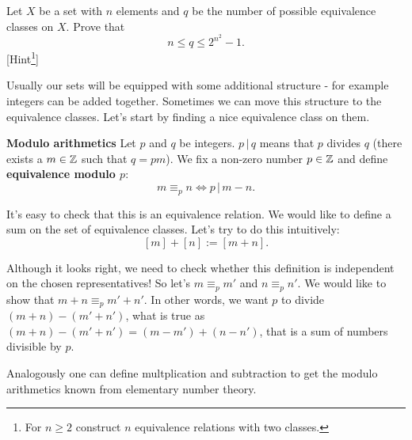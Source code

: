 \begin{exercise}
  Let $X$ be a set with $n$ elements and $q$ be the number of possible equivalence classes on $X$. Prove that $$n\le q \le 2^{n^2}-1.$$ [Hint\footnote{For $n\ge 2$ construct $n$ equivalence relations with two classes.}]
\end{exercise}

Usually our sets will be equipped with some additional structure - for example integers can be added together. Sometimes we can move this structure to the equivalence classes. Let's start by finding a nice equivalence class on them.

\begin{example}
  \textbf{Modulo arithmetics}
  Let $p$ and $q$ be integers. $p\,|\,q$ means that $p$ divides $q$ (there exists a $m\in \mathbb Z$ such that $q=pm$). We fix a non-zero number $p\in \mathbb Z$ and define \textbf{equivalence modulo $p$}:
  $$m\equiv_p n \Leftrightarrow p\,|\,m-n.$$

  It's easy to check that this is an equivalence relation. We would like to define a sum on the set of equivalence classes. Let's try to do this intuitively:
  $$[m] + [n] := [m+n].$$

  Although it looks right, we need to check whether this definition is independent on the chosen representatives! So let's $m\equiv_p m'$ and $n\equiv_p n'$. We would like to show
  that $m+n\equiv_p m'+n'$. In other words, we want $p$ to divide $(m+n)-(m'+n')$, what is true as $(m+n)-(m'+n')=(m-m')+(n-n')$, that is a sum of numbers divisible by $p$.
\end{example}

Analogously one can define multplication and subtraction to get the modulo arithmetics known from elementary number theory.

